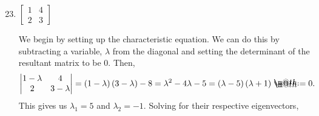 \documentclass{article}
\makeatletter
\newcommand*{\defeq}{\mathrel{\rlap{%
                     \raisebox{0.3ex}{$\m@th\cdot$}}%
                     \raisebox{-0.3ex}{$\m@th\cdot$}}%
                     =}
\makeatother
\begin{document}
\begin{enumerate}
    \setcounter{enumi}{22}
    \item \(\begin{bmatrix}
        1&4\\2&3 
    \end{bmatrix}\)\begin{solution}
        We begin by setting up the characteristic equation. We can do this by subtracting a variable, \(\lambda\) from the diagonal and setting the determinant of the resultant matrix to be 0. Then,\[
            \begin{vmatrix}
                1 - \lambda & 4 \\ 2 & 3-\lambda 
            \end{vmatrix}= (1-\lambda)\,(3-\lambda) - 8 = \lambda^2 - 4\lambda - 5 = (\lambda - 5)\,(\lambda + 1)\defeq 0 . 
        \] This gives us \(\lambda_1 = 5\) and \(\lambda_2 = -1\). Solving for their respective eigenvectors,
\end{solution}
\end{enumerate}
\end{document}
